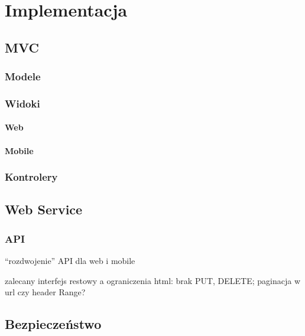 \documentclass[11pt]{aghdpl}
\begin{document}
\chapter{Implementacja}
\label{cha:implementacja}

\section{MVC}

\subsection{Modele}

\subsection{Widoki}


\subsubsection{Web}

\subsubsection{Mobile}

\subsection{Kontrolery}


\section{Web Service}

\subsection{API}

``rozdwojenie'' API dla web i mobile

zalecany interfejs restowy a ograniczenia html: brak PUT, DELETE; paginacja w url czy header Range?

\section{Bezpieczeństwo}
\end{document}
